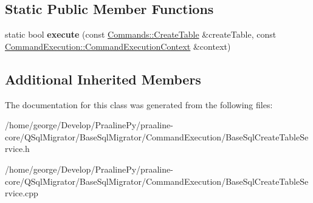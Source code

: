 \subsection*{Static Public Member Functions}
\begin{DoxyCompactItemize}
\item 
\mbox{\label{class_q_sql_migrator_1_1_command_execution_1_1_base_sql_create_table_service_adb55f932a6220fbdb587c6570fc88b4a}} 
static bool {\bfseries execute} (const \hyperlink{class_q_sql_migrator_1_1_commands_1_1_create_table}{Commands\+::\+Create\+Table} \&create\+Table, const \hyperlink{class_q_sql_migrator_1_1_command_execution_1_1_command_execution_context}{Command\+Execution\+::\+Command\+Execution\+Context} \&context)
\end{DoxyCompactItemize}
\subsection*{Additional Inherited Members}


The documentation for this class was generated from the following files\+:\begin{DoxyCompactItemize}
\item 
/home/george/\+Develop/\+Praaline\+Py/praaline-\/core/\+Q\+Sql\+Migrator/\+Base\+Sql\+Migrator/\+Command\+Execution/Base\+Sql\+Create\+Table\+Service.\+h\item 
/home/george/\+Develop/\+Praaline\+Py/praaline-\/core/\+Q\+Sql\+Migrator/\+Base\+Sql\+Migrator/\+Command\+Execution/Base\+Sql\+Create\+Table\+Service.\+cpp\end{DoxyCompactItemize}
